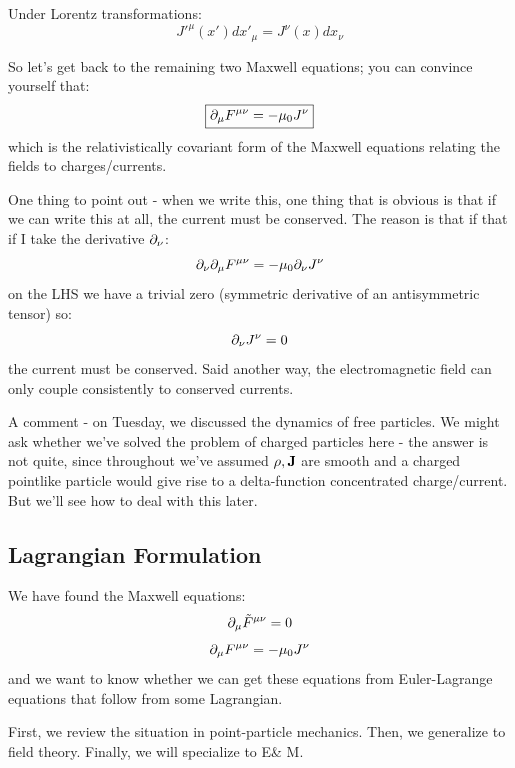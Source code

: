 Under Lorentz transformations:
\begin{equation}
    J'^\mu(x')dx'_\mu = J^\nu(x)dx_\nu
\end{equation}

So let's get back to the remaining two Maxwell equations; you can convince yourself that:
\begin{equation}
    \boxed{\partial_\mu F^{\mu\nu} = -\mu_0 J^\nu}
\end{equation}
which is the relativistically covariant form of the Maxwell equations relating the fields to charges/currents.

One thing to point out - when we write this, one thing that is obvious is that if we can write this at all, the current must be conserved. The reason is that if that if I take the derivative $\partial_\nu$:
\begin{equation}
    \partial_\nu \partial_\mu F^{\mu\nu} = -\mu_0 \partial_\nu J^\nu
\end{equation}
on the LHS we have a trivial zero (symmetric derivative of an antisymmetric tensor) so:
\begin{equation}
    \partial_\nu J^\nu = 0
\end{equation}
the current must be conserved. Said another way, the electromagnetic field can only couple consistently to conserved currents.

A comment - on Tuesday, we discussed the dynamics of free particles. We might ask whether we've solved the problem of charged particles here - the answer is not quite, since throughout we've assumed $\rho, \mathbf{J}$ are smooth and a charged pointlike particle would give rise to a delta-function concentrated charge/current. But we'll see how to deal with this later.

\subsection{Lagrangian Formulation}
We have found the Maxwell equations:
\begin{equation}
    \partial_\mu \tilde{F}^{\mu\nu} = 0
\end{equation}
\begin{equation}
    \partial_\mu F^{\mu\nu} = -\mu_0 J^\nu
\end{equation}
and we want to know whether we can get these equations from Euler-Lagrange equations that follow from some Lagrangian.

First, we review the situation in point-particle mechanics. Then, we generalize to field theory. Finally, we will specialize to E\& M.

